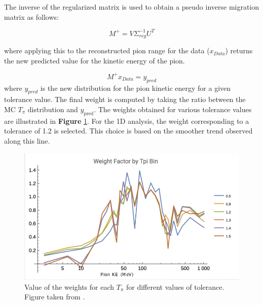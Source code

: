 The inverse of the regularized matrix is used to obtain a pseudo inverse migration matrix as follows:

\begin{equation}
    M^+ = V\Sigma^{-1}_{reg} U^T
\end{equation}

where applying this to the reconstructed pion range for the data ($x_{Data}$) returns the new predicted value for the kinetic energy of the pion. 

\begin{equation}
    M^+ x_{Data} = y_{pred}
\end{equation}
 where $y_{pred}$ is the new distribution for the pion kinetic energy for a given tolerance value. The final weight is computed by taking the ratio between the MC $T_\pi$ distribution and $y_{\text{pred}}$. The weights obtained for various tolerance values are illustrated in \textbf{Figure} \ref{fig:Simulation:MnvGENIETunes:PionReweight:TpiWeight}. For the 1D analysis, the weight corresponding to a tolerance of 1.2 is selected. This choice is based on the smoother trend observed along this line.
 

\begin{figure}[!htb]
    \centering
    \includegraphics[scale=0.4]{Figures/Chapter3/TpiWeight.png}
    \caption{Value of the weights for each $T_\pi$ for different values of tolerance. Figure taken from \cite{PionReweight}.}
    \label{fig:Simulation:MnvGENIETunes:PionReweight:TpiWeight}
\end{figure}

